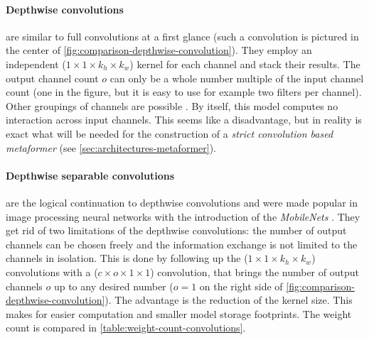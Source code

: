 \paragraph{Depthwise convolutions} are similar to full convolutions at a first glance (such a convolution is pictured in the center of \autoref{fig:comparison-depthwise-convolution}).
They employ an independent ($1\times 1 \times k_h \times k_w$) kernel for each channel and stack their results.
The output channel count $o$ can only be a whole number multiple of the input channel count (one in the figure, but it is easy to use for example two filters per channel).
Other groupings of channels are possible \cite{channelNets}.
By itself, this model computes no interaction across input channels. 
This seems like a disadvantage, but in reality is exact what will be needed for the construction of a \emph{strict convolution based metaformer} (see \autoref{sec:architectures-metaformer}).

\paragraph{Depthwise separable convolutions} are the logical continuation to depthwise convolutions and were made popular in image processing neural networks with the introduction of the \emph{MobileNets} \cite{mobileNetPaper}.
They get rid of two limitations of the depthwise convolutions: the number of output channels can be chosen freely and the information exchange is not limited to the channels in isolation.
This is done by following up the ($1\times 1 \times k_h \times k_w$) convolutions with a ($c \times o \times 1 \times 1$) convolution, that brings the number of output channels $o$ up to any desired number ($o =1$ on the right side of \autoref{fig:comparison-depthwise-convolution}).
The advantage is the reduction of the kernel size. This makes for easier computation and smaller model storage footprints. 
The weight count is compared in \autoref{table:weight-count-convolutions}.

